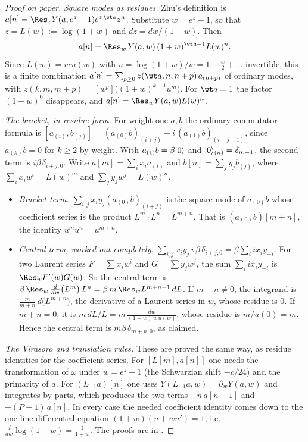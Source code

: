 \begin{proof}[Proof on paper]
\emph{Square modes as residues.} Zhu's definition is $a[n]=\Res_z Y(a,e^z-1)e^{z\,\wt a}z^{n}$. Substitute
$w=e^z-1$, so that $z=L(w):=\log(1+w)$ and $dz=dw/(1+w)$. Then
\begin{equation*}
a[n]=\Res_w\,Y(a,w)\,(1+w)^{\wt a-1}L(w)^n .
\end{equation*}
Since $L(w)=w\,u(w)$ with $u=\log(1+w)/w=1-\frac w2+\dots$ invertible, this is a finite combination
$a[n]=\sum_{p\ge0}z(\wt a,n,n+p)\,a_{(n+p)}$ of ordinary modes, with $z(k,m,m+p)=[w^p]\big((1+w)^{k-1}u^m\big)$. For
$\wt a=1$ the factor $(1+w)^0$ disappears, and $a[n]=\Res_wY(a,w)L(w)^n$.

\emph{The bracket, in residue form.} For weight-one $a,b$ the ordinary commutator formula is
$[a_{(i)},b_{(j)}]=(a_{(0)}b)_{(i+j)}+i\,(a_{(1)}b)_{(i+j-1)}$, since $a_{(k)}b=0$ for $k\ge2$ by weight. With
$a_{(1)}b=\beta|0\rangle$ and $|0\rangle_{(n)}=\delta_{n,-1}$, the second term is $i\beta\,\delta_{i+j,0}$.
Write $a[m]=\sum_ix_ia_{(i)}$ and $b[n]=\sum_jy_jb_{(j)}$, where $\sum_ix_iw^i=L(w)^m$ and $\sum_jy_jw^j=L(w)^n$.
\begin{itemize}
\item \emph{Bracket term.} $\sum_{i,j}x_iy_j(a_{(0)}b)_{(i+j)}$ is the square mode of $a_{(0)}b$ whose
  coefficient series is the product $L^m\cdot L^n=L^{m+n}$. That is $(a_{(0)}b)[m+n]$, the identity
  $u^mu^n=u^{m+n}$.
\item \emph{Central term, worked out completely.} $\sum_{i,j}x_iy_j\,i\,\beta\,\delta_{i+j,0}=\beta\sum_iix_iy_{-i}$.
  For two Laurent series $F=\sum x_iw^i$ and $G=\sum y_jw^j$, the sum $\sum_i i x_iy_{-i}$ is $\Res_w F'(w)G(w)$. So the
  central term is $\beta\,\Res_w\,\frac{d}{dw}\big(L^m\big)\,L^n=\beta\,m\,\Res_w L^{m+n-1}\,dL$. If $m+n\ne0$, the
  integrand is $\frac{m}{m+n}\,d\big(L^{m+n}\big)$, the derivative of a Laurent series in $w$, whose residue is $0$. If
  $m+n=0$, it is $m\,dL/L=m\,\frac{dw}{(1+w)\,w\,u(w)}$, whose residue is $m/u(0)=m$. Hence the central term is
  $m\beta\,\delta_{m+n,0}$, as claimed.
\end{itemize}
\emph{The Virasoro and translation rules.} These are proved the same way, as residue identities for the coefficient
series. For $[L[m],a[n]]$ one needs the transformation of $\omega$ under $w=e^z-1$ (the Schwarzian shift
$-c/24$) and the primarity of $a$. For $(L_{-1}a)[n]$ one uses $Y(L_{-1}a,w)=\partial_wY(a,w)$ and integrates by parts,
which produces the two terms $-n\,a[n-1]$ and $-(P+1)\,a[n]$. In every case the needed coefficient identity comes down
to the one-line differential equation $(1+w)(u+wu')=1$, i.e.\ $\frac{d}{dw}\log(1+w)=\frac1{1+w}$. The proofs are in
.
\end{proof}
